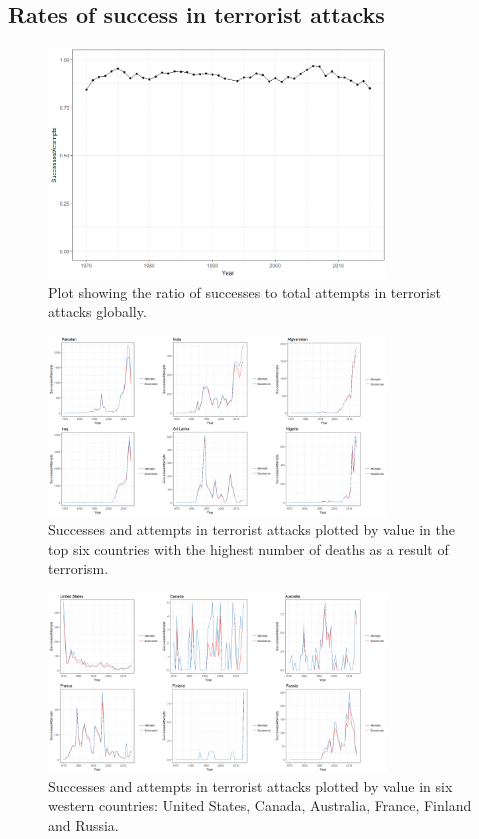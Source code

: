 \documentclass[10pt,a4paper]{article}
\begin{document}
\subsection{Rates of success in terrorist attacks}
\begin{center}
	
\begin{figure}[H]
	\includegraphics[width=0.8\textwidth]{Plots/OverTime/Successes_vs_Attempts_by_Year.png}
	\caption{Plot showing the ratio of successes to total attempts in terrorist attacks globally.}
\end{figure}

\begin{figure}[H]	
	\includegraphics[width=0.8\textwidth]{Plots/OverTime/Top6SuccessVsAttempts.png}
	\caption{Successes and attempts in terrorist attacks plotted by value in the top six countries with the highest number of deaths as a result of terrorism.}
\end{figure}

\begin{figure}[H]
	\includegraphics[width=0.8\textwidth]{Plots/OverTime/WesternSuccessVsAttempts.png}
	\caption{Successes and attempts in terrorist attacks plotted by value in six western countries: United States, Canada, Australia, France, Finland and Russia.}
\end{figure}
	
\end{center}
\end{document}
